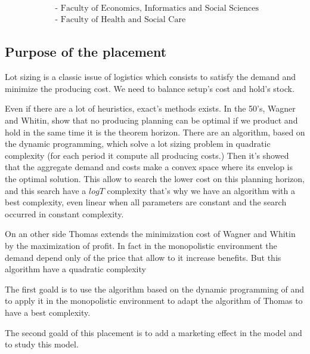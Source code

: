 \begin{align*}
    &\text{- Faculty of Economics, Informatics and Social Sciences }\\
    &\text{- Faculty of Health and Social Care}
\end{align*}


\subsection{Purpose of the placement}
Lot sizing is a classic issue of logistics which consists to satisfy the demand 
and minimize the producing cost. We need to balance setup's cost and hold's stock.

Even if there are a lot of heuristics, exact's methods exists. In the 50's, 
Wagner and Whitin\cite{Wagner&Whitin58}, show that no producing planning can be optimal 
if we product and hold in the same time it is the theorem horizon. There are an 
algorithm, based on the dynamic programming, which solve a lot sizing problem in 
quadratic complexity (for each period it compute all producing costs.)
Then it's showed that the aggregate demand and costs make a 
convex space where its envelop is the optimal solution\cite{Wagelmans&Kolen92}.
This allow to search the lower cost on this planning horizon, and this search 
have a $logT$ complexity that's why we have an algorithm with a best complexity, 
even linear when all parameters are constant and the search occurred in constant
complexity.

On an other side Thomas\cite{Thomas70} extends the minimization cost of Wagner
 and Whitin \cite{Wagner&Whitin58} by the maximization of profit. In fact in the
 monopolistic environment the demand depend only of the price that allow to it 
 increase benefits. But this algorithm have a quadratic complexity
 
The first goald is to use the algorithm based on the dynamic programming 
of \cite{Wagelmans&Kolen92} and to apply it in the monopolistic environment to 
adapt the algorithm of Thomas to have a best complexity.

The second goald of this placement is to add a marketing effect in the model
and to study this model. 

